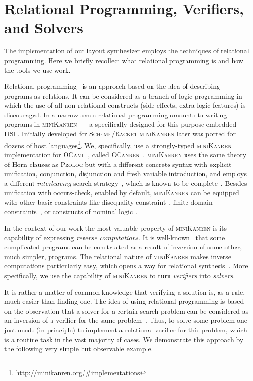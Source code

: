 \section{Relational Programming, Verifiers, and Solvers}
\label{sec:rel}

The implementation of our layout synthesizer employs the techniques of relational programming. Here
we briefly recollect what relational programming is and how the tools we use work.

Relational programming~\cite{TRS} is an approach based on the idea of describing programs as
relations. It can be considered as a branch of logic programming in which the use of
all non-relational constructs (side-effects, extra-logic features) is discouraged. In a
narrow sense relational programming amounts to writing programs in \textsc{miniKanren}~--- a
specifically designed for this purpose embedded DSL. Initially developed for \textsc{Scheme}/\textsc{Racket}
\textsc{miniKanren} later was ported for dozens of host languages\footnote{http://minikanren.org/\#implementations}.
We, specifically, use a strongly-typed \textsc{miniKanren} implementation for \textsc{OCaml}~\cite{ocaml}, called \textsc{OCanren}~\cite{OCanren}.
\textsc{miniKanren} uses the same theory of Horn clauses as \textsc{Prolog} but with a different
concrete syntax with explicit unification, conjunction, disjunction and fresh variable introduction, and
employs a different \emph{interleaving} search strategy~\cite{interleaving}, which is known to be complete~\cite{certified}.
Besides unification with occurs-check, enabled by default, \textsc{miniKanren} can be equipped with other
basic constraints like disequality constraint~\cite{disuni}, finite-domain constraints~\cite{cKanren}, or
constructs of nominal logic~\cite{aKanren}.

In the context of our work the most valuable property of \textsc{miniKanren} is its capability of expressing \emph{reverse computations}.
It is well-known~\cite{SemanticsModifiers,SemanticsModifiers1} that some complicated programs can be constructed as
a result of inversion of some other, much simpler, programs. The relational nature of \textsc{miniKanren} makes
inverse computations particularly easy, which opens a way for relational synthesis~\cite{Untagged,WBirdSeven,PatternMatching}.
More specifically, we use the capability of \textsc{miniKanren} to turn \emph{verifiers} into \emph{solvers}.

It is rather a matter of common knowledge that verifying a solution is, as a rule, much easier than finding one. The idea
of using relational programming is based on the observation that a solver for a certain search problem can be considered as
an inversion of a verifier for the same problem~\cite{searchproblems}. Thus, to solve some problem one just needs (in principle)
to implement a relational verifier for this problem, which is a routine task in the vast majority of cases. We demonstrate
this approach by the following very simple but observable example.

